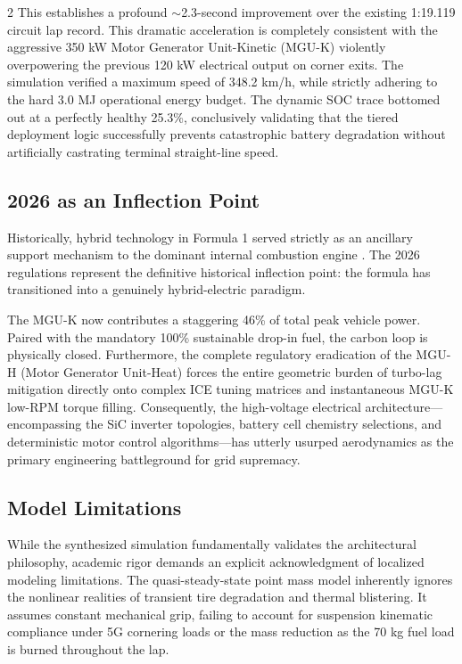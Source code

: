 \begin{multicols}{2}
This establishes a profound $\sim$2.3-second improvement over the existing 1:19.119 circuit lap record. This dramatic acceleration is completely consistent with the aggressive 350 kW Motor Generator Unit-Kinetic (MGU-K) violently overpowering the previous 120 kW electrical output on corner exits. The simulation verified a maximum speed of 348.2 km/h, while strictly adhering to the hard 3.0 MJ operational energy budget. The dynamic SOC trace bottomed out at a perfectly healthy 25.3\%, conclusively validating that the tiered deployment logic successfully prevents catastrophic battery degradation without artificially castrating terminal straight-line speed.

\subsection{2026 as an Inflection Point}

Historically, hybrid technology in Formula 1 served strictly as an ancillary support mechanism to the dominant internal combustion engine \cite{f1_hybrid_history}. The 2026 regulations represent the definitive historical inflection point: the formula has transitioned into a genuinely hybrid-electric paradigm. 

The MGU-K now contributes a staggering 46\% of total peak vehicle power. Paired with the mandatory 100\% sustainable drop-in fuel, the carbon loop is physically closed. Furthermore, the complete regulatory eradication of the MGU-H (Motor Generator Unit-Heat) forces the entire geometric burden of turbo-lag mitigation directly onto complex ICE tuning matrices and instantaneous MGU-K low-RPM torque filling. Consequently, the high-voltage electrical architecture—encompassing the SiC inverter topologies, battery cell chemistry selections, and deterministic motor control algorithms—has utterly usurped aerodynamics as the primary engineering battleground for grid supremacy.

\subsection{Model Limitations}

While the synthesized simulation fundamentally validates the architectural philosophy, academic rigor demands an explicit acknowledgment of localized modeling limitations. The quasi-steady-state point mass model inherently ignores the nonlinear realities of transient tire degradation and thermal blistering. It assumes constant mechanical grip, failing to account for suspension kinematic compliance under 5G cornering loads or the mass reduction as the 70 kg fuel load is burned throughout the lap.


\end{multicols}
